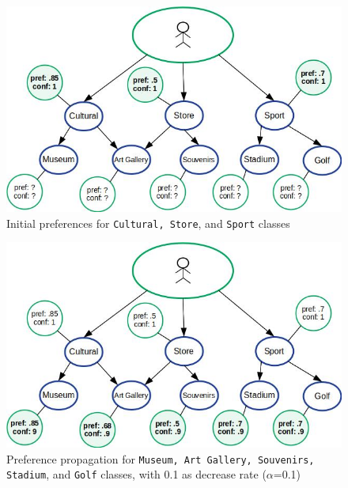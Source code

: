\begin{figure}[h]
\vspace{-0.3cm}
\centering
\includegraphics[scale=0.39]{draws/initial_pref.jpg}
\vspace{-0.3cm}
\caption{Initial preferences for {\tt Cultural, Store}, and {\tt Sport} classes}
\label{fig:initial_pref}
\vspace{-0.3cm}
\end{figure}

\begin{figure}[h]
\vspace{-0.3cm}
\centering
\includegraphics[scale=0.39]{draws/pref_spred.jpg}
\vspace{-0.3cm}
\caption{Preference propagation for {\tt Museum, Art Gallery, Souvenirs, Stadium}, and {\tt Golf} classes, with 0.1 as decrease rate ($\alpha$=0.1)}
\label{fig:pref_prop}
\vspace{-0.3cm}
\end{figure}

\vspace{-0.3cm}
